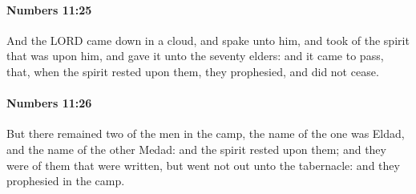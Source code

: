 		\paragraph{Numbers 11:25} %
			\label{NUMBERS-11-25}

			And the LORD came down in a cloud, and spake unto him, and took of the spirit that was upon him, and gave it unto the seventy elders: and it came to pass, that, when the spirit rested upon them, they prophesied, and did not cease.


		\paragraph{Numbers 11:26} %
			\label{NUMBERS-11-26}

			But there remained two of the men in the camp, the name of the one was Eldad, and the name of the other Medad: and the spirit rested upon them; and they were of them that were written, but went not out unto the tabernacle: and they prophesied in the camp.

